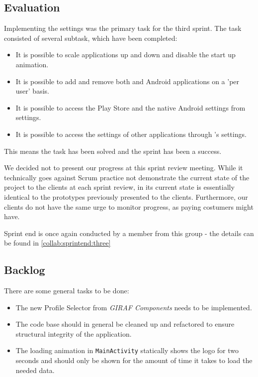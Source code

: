 \subsection{Evaluation}
Implementing the settings was the primary task for the third sprint.
The task consisted of several subtask, which have been completed:

\begin{itemize}
\item It is possible to scale applications up and down and disable the start up animation.
\item It is possible to add and remove both \giraf and Android applications on a 'per user' basis.
\item It is possible to access the Play Store and the native Android settings from settings.
\item It is possible to access the settings of other \giraf applications through \launcher 's settings.
\end{itemize}

This means the task has been solved and the sprint has been a success. 

We decided not to present our progress at this sprint review meeting. While it technically goes against Scrum practice not demonstrate the current state of the project to the clients at each sprint review, \settingsactivity in its current state is essentially identical to the prototypes previously presented to the clients. Furthermore, our clients do not have the same urge to monitor progress, as paying costumers might have.

Sprint end is once again conducted by a member from this group - the details can be found in \cref{collab:sprintend:three}

\subsection{Backlog}

There are some general tasks to be done:

\begin{itemize}
\item The new Profile Selector from \textit{GIRAF Components} needs to be implemented.
\item The code base should in general be cleaned up and refactored to ensure structural integrity of the application.
\item The loading animation in \lstinline!MainActivity! statically shows the logo for two seconds and should only be shown for the amount of time it takes to load the needed data.
\end{itemize}

